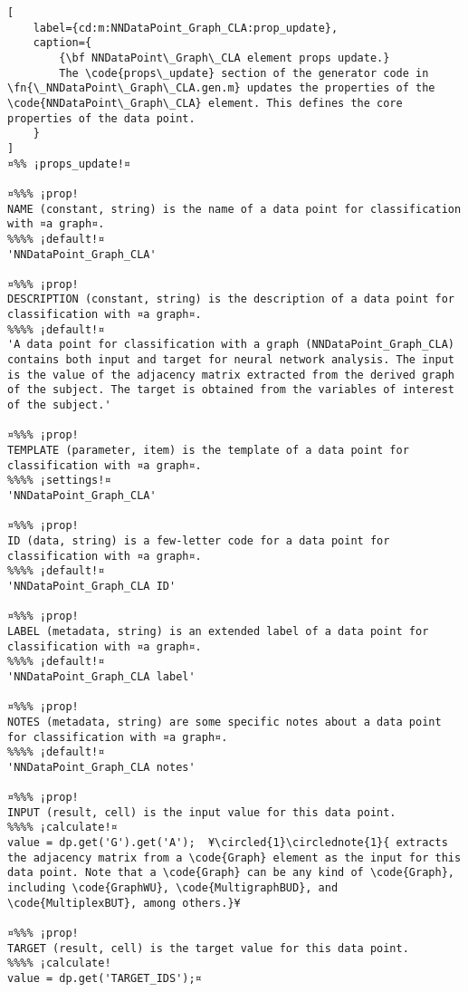 \documentclass{tufte-handout}
\begin{document}
\begin{lstlisting}[
	label={cd:m:NNDataPoint_Graph_CLA:prop_update},
	caption={
		{\bf NNDataPoint\_Graph\_CLA element props update.}
		The \code{props\_update} section of the generator code in \fn{\_NNDataPoint\_Graph\_CLA.gen.m} updates the properties of the \code{NNDataPoint\_Graph\_CLA} element. This defines the core properties of the data point.
	}
]
¤%% ¡props_update!¤

¤%%% ¡prop!
NAME (constant, string) is the name of a data point for classification with ¤a graph¤.
%%%% ¡default!¤
'NNDataPoint_Graph_CLA'

¤%%% ¡prop!
DESCRIPTION (constant, string) is the description of a data point for classification with ¤a graph¤.
%%%% ¡default!¤
'A data point for classification with a graph (NNDataPoint_Graph_CLA) contains both input and target for neural network analysis. The input is the value of the adjacency matrix extracted from the derived graph of the subject. The target is obtained from the variables of interest of the subject.'

¤%%% ¡prop!
TEMPLATE (parameter, item) is the template of a data point for classification with ¤a graph¤.
%%%% ¡settings!¤
'NNDataPoint_Graph_CLA'

¤%%% ¡prop!
ID (data, string) is a few-letter code for a data point for classification with ¤a graph¤.
%%%% ¡default!¤
'NNDataPoint_Graph_CLA ID'

¤%%% ¡prop!
LABEL (metadata, string) is an extended label of a data point for classification with ¤a graph¤.
%%%% ¡default!¤
'NNDataPoint_Graph_CLA label'

¤%%% ¡prop!
NOTES (metadata, string) are some specific notes about a data point for classification with ¤a graph¤.
%%%% ¡default!¤
'NNDataPoint_Graph_CLA notes'

¤%%% ¡prop!
INPUT (result, cell) is the input value for this data point.
%%%% ¡calculate!¤
value = dp.get('G').get('A');  ¥\circled{1}\circlednote{1}{ extracts the adjacency matrix from a \code{Graph} element as the input for this data point. Note that a \code{Graph} can be any kind of \code{Graph}, including \code{GraphWU}, \code{MultigraphBUD}, and \code{MultiplexBUT}, among others.}¥
    
¤%%% ¡prop!
TARGET (result, cell) is the target value for this data point.
%%%% ¡calculate!
value = dp.get('TARGET_IDS');¤

\end{lstlisting}
\end{document}
